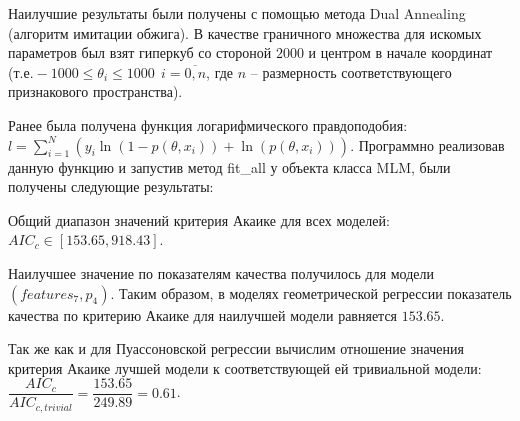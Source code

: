 Наилучшие результаты были получены с помощью метода Dual Annealing (алгоритм имитации обжига). В качестве граничного множества для искомых параметров был взят гиперкуб со стороной  $2000$ и центром в начале координат (т.е$. -1000 \leq \theta_i \leq 1000~~i = \overline{0,n}$, где $n$ -- размерность соответствующего признакового пространства).

Ранее была получена функция логарифмического правдоподобия: $l = \sum\limits_{i = 1}^N ( y_i \ln(1 - p(\theta, x_i)) + \ln(p(\theta, x_i)) )$. Программно реализовав данную функцию и запустив метод fit\_all у объекта класса MLM, были получены следующие результаты:

\clearpage



Общий диапазон значений критерия Акаике для всех моделей: $AIC_c \in [153.65, 918.43]$.


Наилучшее значение по показателям качества получилось для модели $(features_7, p_4)$. Таким образом, в моделях геометрической регрессии показатель качества по критерию Акаике для наилучшей модели равняется $153.65$.


Так же как и для Пуассоновской регрессии вычислим отношение значения критерия Акаике лучшей модели к соответствующей ей тривиальной модели: $\dfrac{AIC_c}{AIC_{c, trivial}} = \dfrac{153.65}{249.89} = 0.61$.





